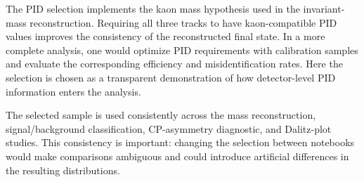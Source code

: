 The PID selection implements the kaon mass hypothesis used in the invariant-mass reconstruction. Requiring all three tracks to have kaon-compatible PID values improves the consistency of the reconstructed final state. In a more complete analysis, one would optimize PID requirements with calibration samples and evaluate the corresponding efficiency and misidentification rates. Here the selection is chosen as a transparent demonstration of how detector-level PID information enters the analysis.

The selected sample is used consistently across the mass reconstruction, signal/background classification, CP-asymmetry diagnostic, and Dalitz-plot studies. This consistency is important: changing the selection between notebooks would make comparisons ambiguous and could introduce artificial differences in the resulting distributions.
